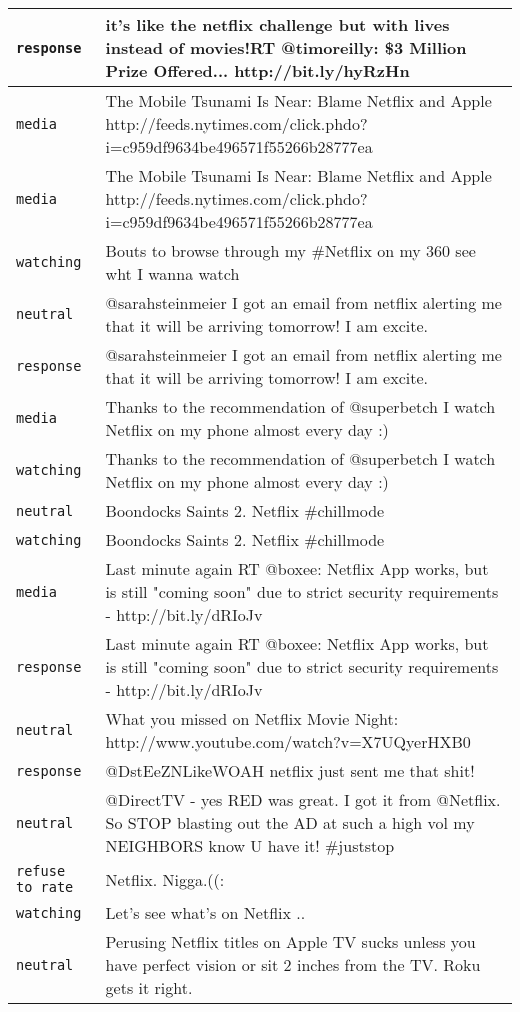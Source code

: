 {\begin{longtable}{|l|p{160mm}|}
      \tabularnewline\hline
         \texttt{response} & it's like the netflix challenge but with lives instead of movies!RT @timoreilly: \$3 Million Prize Offered... http://bit.ly/hyRzHn
      \tabularnewline\hline
         \texttt{media} & The Mobile Tsunami Is Near: Blame Netflix and Apple http://feeds.nytimes.com/click.phdo?i=c959df9634be496571f55266b28777ea
      \tabularnewline\hline
         \texttt{media} & The Mobile Tsunami Is Near: Blame Netflix and Apple http://feeds.nytimes.com/click.phdo?i=c959df9634be496571f55266b28777ea
      \tabularnewline\hline
         \texttt{watching} & Bouts to browse through my \#Netflix on my 360 see wht I wanna watch
      \tabularnewline\hline
         \texttt{neutral} & @sarahsteinmeier I got an email from netflix alerting me that it will be arriving tomorrow! I am excite.
      \tabularnewline\hline
         \texttt{response} & @sarahsteinmeier I got an email from netflix alerting me that it will be arriving tomorrow! I am excite.
      \tabularnewline\hline
         \texttt{media} & Thanks to the recommendation of @superbetch I watch Netflix on my phone almost every day :)
      \tabularnewline\hline
         \texttt{watching} & Thanks to the recommendation of @superbetch I watch Netflix on my phone almost every day :)
      \tabularnewline\hline
         \texttt{neutral} & Boondocks Saints 2. Netflix \#chillmode
      \tabularnewline\hline
         \texttt{watching} & Boondocks Saints 2. Netflix \#chillmode
      \tabularnewline\hline
         \texttt{media} & Last minute again RT @boxee: Netflix App works, but is still "coming soon" due to strict security requirements - http://bit.ly/dRIoJv
      \tabularnewline\hline
         \texttt{response} & Last minute again RT @boxee: Netflix App works, but is still "coming soon" due to strict security requirements - http://bit.ly/dRIoJv
      \tabularnewline\hline
         \texttt{neutral} & What you missed on Netflix Movie Night: http://www.youtube.com/watch?v=X7UQyerHXB0
      \tabularnewline\hline
         \texttt{response} & @DstEeZNLikeWOAH netflix just sent me that shit!
      \tabularnewline\hline
         \texttt{neutral} & @DirectTV - yes RED was great. I got it from @Netflix. So STOP blasting out the AD at such a high vol my NEIGHBORS know U have it! \#juststop
      \tabularnewline\hline
         \texttt{refuse to rate} & Netflix. Nigga.((:
      \tabularnewline\hline
         \texttt{watching} & Let's see what's on Netflix ..
      \tabularnewline\hline
         \texttt{neutral} & Perusing Netflix titles on Apple TV sucks unless you have perfect vision or sit 2 inches from the TV. Roku gets it right.

\end{longtable}}
